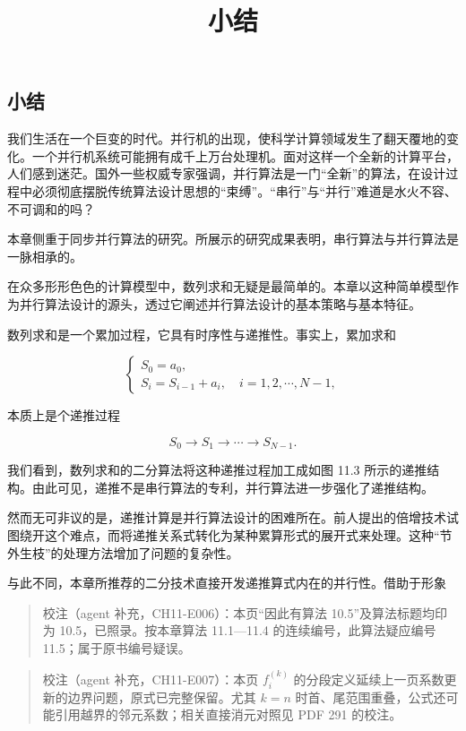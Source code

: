 \documentclass[
  10pt,
  fontset=fandol]{ctexart}
\title{小结}
\author{}
\date{}
\begin{document}
\maketitle

\subsection{小结}\label{ux5c0fux7ed3}

我们生活在一个巨变的时代。并行机的出现，使科学计算领域发生了翻天覆地的变化。一个并行机系统可能拥有成千上万台处理机。面对这样一个全新的计算平台，人们感到迷茫。国外一些权威专家强调，并行算法是一门``全新''的算法，在设计过程中必须彻底摆脱传统算法设计思想的``束缚''。``串行''与``并行''难道是水火不容、不可调和的吗？

本章侧重于同步并行算法的研究。所展示的研究成果表明，串行算法与并行算法是一脉相承的。

在众多形形色色的计算模型中，数列求和无疑是最简单的。本章以这种简单模型作为并行算法设计的源头，透过它阐述并行算法设计的基本策略与基本特征。

数列求和是一个累加过程，它具有时序性与递推性。事实上，累加求和

\[
\begin{cases}
S_0=a_0,\\
S_i=S_{i-1}+a_i,\quad i=1,2,\cdots,N-1,
\end{cases}
\]

本质上是个递推过程

\[
S_0\to S_1\to\cdots\to S_{N-1}.
\]

我们看到，数列求和的二分算法将这种递推过程加工成如图 11.3 所示的递推结构。由此可见，递推不是串行算法的专利，并行算法进一步强化了递推结构。

然而无可非议的是，递推计算是并行算法设计的困难所在。前人提出的倍增技术试图绕开这个难点，而将递推关系式转化为某种累算形式的展开式来处理。这种``节外生枝''的处理方法增加了问题的复杂性。

与此不同，本章所推荐的二分技术直接开发递推算式内在的并行性。借助于形象

\begin{quote}
校注（agent 补充，CH11-E006）：本页``因此有算法 10.5''及算法标题均印为 10.5，已照录。按本章算法 11.1---11.4 的连续编号，此算法疑应编号 11.5；属于原书编号疑误。
\end{quote}

\begin{quote}
校注（agent 补充，CH11-E007）：本页 \(f_i^{(k)}\) 的分段定义延续上一页系数更新的边界问题，原式已完整保留。尤其 \(k=n\) 时首、尾范围重叠，公式还可能引用越界的邻元系数；相关直接消元对照见 PDF 291 的校注。
\end{quote}
\end{document}
